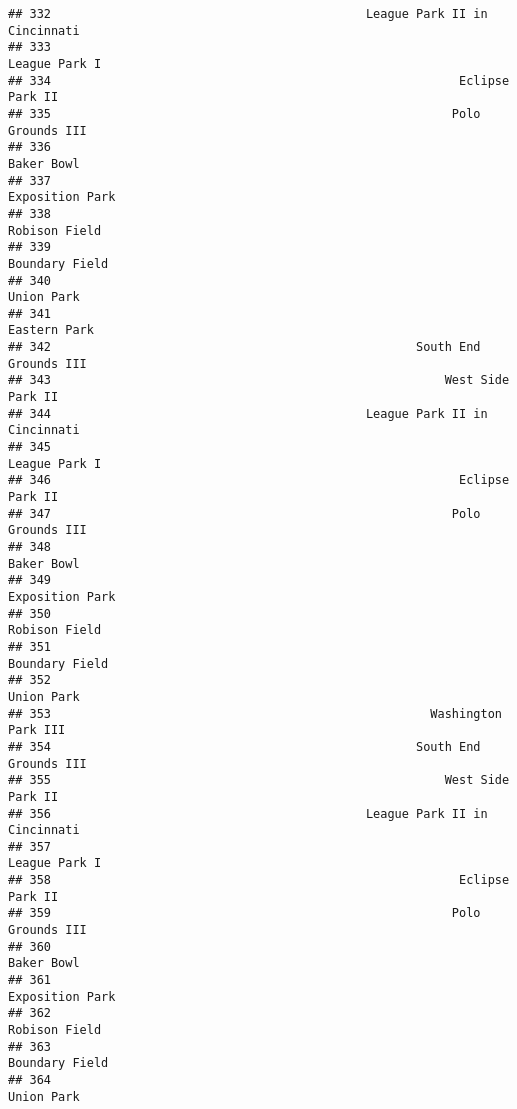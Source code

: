 \documentclass[]{article}
\begin{document}
\begin{verbatim}
## 332                                            League Park II in Cincinnati
## 333                                                           League Park I
## 334                                                         Eclipse Park II
## 335                                                        Polo Grounds III
## 336                                                              Baker Bowl
## 337                                                         Exposition Park
## 338                                                           Robison Field
## 339                                                          Boundary Field
## 340                                                              Union Park
## 341                                                            Eastern Park
## 342                                                   South End Grounds III
## 343                                                       West Side Park II
## 344                                            League Park II in Cincinnati
## 345                                                           League Park I
## 346                                                         Eclipse Park II
## 347                                                        Polo Grounds III
## 348                                                              Baker Bowl
## 349                                                         Exposition Park
## 350                                                           Robison Field
## 351                                                          Boundary Field
## 352                                                              Union Park
## 353                                                     Washington Park III
## 354                                                   South End Grounds III
## 355                                                       West Side Park II
## 356                                            League Park II in Cincinnati
## 357                                                           League Park I
## 358                                                         Eclipse Park II
## 359                                                        Polo Grounds III
## 360                                                              Baker Bowl
## 361                                                         Exposition Park
## 362                                                           Robison Field
## 363                                                          Boundary Field
## 364                                                              Union Park

\end{verbatim}
\end{document}
